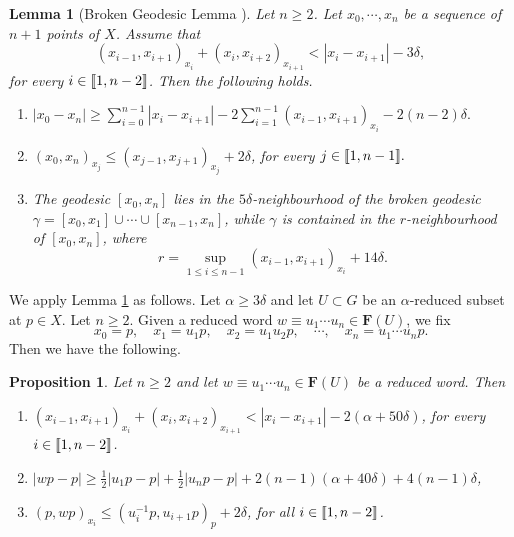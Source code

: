 \documentclass[leqno,a4paper,10pt]{amsart}
\theoremstyle{plain}
\newtheorem{prop}[thm]{Proposition}
\newtheorem{lem}[thm]{Lemma}
\theoremstyle{definition}
\theoremstyle{remark}
\newcommand{\F}{\mathbf{F}}
\let\le\leqslant
\let\ge\geqslant
\newcommand{\zinterval}[2]{
	\mathchoice%
	{\left \llbracket #1, \cdots, #2 \right \rrbracket}%
	{\llbracket #1, #2 \rrbracket}%
	{\llbracket #1, #2 \rrbracket}%
	{\llbracket #1, #2 \rrbracket}%
}
\begin{document}
\begin{lem}[{Broken Geodesic Lemma \cite[Lemma~1]{arzhantseva_lower_2006}}]
	\label{lem:broken geodesic}
	Let $n\ge 2$. Let $x_0,\cdots,x_n$ be a sequence of $n+1$ points of $X$. Assume that
	\begin{equation}
		\label{eqn:broken-geodesic}
	(x_{i-1},x_{i+1})_{x_i}+(x_i,x_{i+2})_{x_{i+1}}<|x_i-x_{i+1}|-3\delta,
	\end{equation}
	for every $i\in \zinterval{1}{n-2}$. Then the following holds.
	\begin{enumerate}[label=(\roman*)]
		\item $\displaystyle |x_0-x_n|\ge \sum_{i=0}^{n-1}|x_i-x_{i+1}|-2\sum_{i
			=1}^{n-1}(x_{i-1},x_{i+1})_{x_i}-2(n-2)\delta.$
		\item $(x_0,x_n)_{x_j}\le (x_{j-1},x_{j+1})_{x_j}+2\delta$, for every $j\in\zinterval{1}{n-1}.$
		\item The geodesic $[x_0,x_n]$ lies in the $5\delta$-neighbourhood of the broken geodesic $\gamma=[x_0,x_1]\cup\cdots\cup[x_{n-1},x_n]$, while $\gamma$ is contained in the $r$-neighbourhood of $[x_0,x_n]$, where
				$$r=\sup_{1\le i\le n-1} (x_{i-1},x_{i+1})_{x_i}+14\delta.$$
	\end{enumerate}
\end{lem}


We apply Lemma \ref{lem:broken geodesic} as follows. Let $\alpha\geqslant 3\delta$ and let $U\subset G$ be an $\alpha$-reduced subset at $p\in X$. Let $n\ge 2$. Given a reduced word $w\equiv u_1\cdots u_n \in \F(U)$, we fix    
	$$x_0=p,\quad x_1=u_1p,\quad x_2=u_1u_2p,\quad \cdots,\quad x_n=u_1\cdots u_np.$$
 Then we have the following. 	

\begin{prop}
	\label{prop:broken geodesic reduced subset}
Let $n\ge 2$ and let $w\equiv u_1\cdots u_n \in \F(U)$ be a reduced word. Then 
	\begin{enumerate}[label=(\roman*)]
		\item $(x_{i-1},x_{i+1})_{x_i}+(x_{i},x_{i+2})_{x_{i+1}}<|x_i-x_{i+1}|-2(\alpha+50\delta)$,
		for every $i\in\zinterval{1}{n-2}$.
		\item 	$|wp-p|\ge \frac{1}{2}|u_1p-p|+\frac{1}{2}|u_np-p|+2(n-1)(\alpha+40\delta)+4(n-1)\delta$,
		\item $(p,wp)_{x_i}\le (u_i^{-1}p,u_{i+1}p)_p +2\delta$, for all $i\in \zinterval{1}{n-2}$.
	\end{enumerate}
\end{prop}
\end{document}
